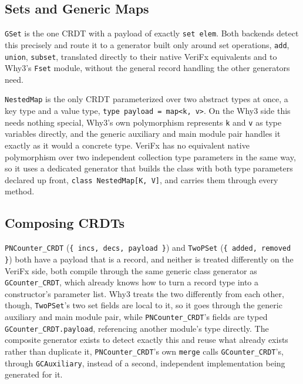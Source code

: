 \subsection{Sets and Generic Maps}
\label{sub:sets-and-maps}

\texttt{GSet} is the one CRDT with a payload of exactly \texttt{set elem}. Both backends detect this precisely and route
it to a generator built only around set operations, \texttt{add}, \texttt{union}, \texttt{subset}, translated directly to
their native VeriFx equivalents and to Why3's \texttt{Fset} module, without the general record handling the other
generators need.

\texttt{NestedMap} is the only CRDT parameterized over two abstract types at once, a key type and a value type,
\texttt{type payload = map<k, v>}. On the Why3 side this needs nothing special, Why3's own polymorphism represents
\texttt{k} and \texttt{v} as type variables directly, and the generic auxiliary and main module pair handles it exactly
as it would a concrete type. VeriFx has no equivalent native polymorphism over two independent collection type parameters
in the same way, so it uses a dedicated generator that builds the class with both type parameters declared up front,
\texttt{class NestedMap[K, V]}, and carries them through every method.

\subsection{Composing CRDTs}
\label{sub:composing-crdts}

\texttt{PNCounter\_CRDT} (\texttt{\{ incs, decs, payload \}}) and \texttt{TwoPSet} (\texttt{\{ added, removed \}}) both
have a payload that is a record, and neither is treated differently on the VeriFx side, both compile through the same
generic class generator as \texttt{GCounter\_CRDT}, which already knows how to turn a record type into a constructor's
parameter list. Why3 treats the two differently from each other, though, \texttt{TwoPSet}'s two set fields are local to
it, so it goes through the generic auxiliary and main module pair, while \texttt{PNCounter\_CRDT}'s fields are typed
\texttt{GCounter\_CRDT.payload}, referencing another module's type directly. The composite generator exists to detect
exactly this and reuse what already exists rather than duplicate it, \texttt{PNCounter\_CRDT}'s own \texttt{merge} calls
\texttt{GCounter\_CRDT}'s, through \texttt{GCAuxiliary}, instead of a second, independent implementation being generated
for it.

